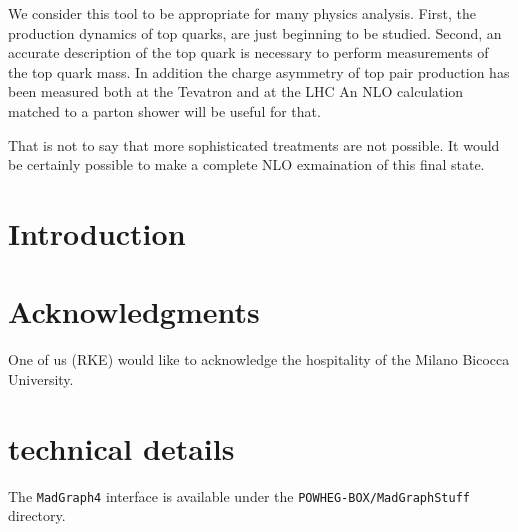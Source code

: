 \documentclass[paper]{JHEP3}
\newcommand\MG{{\tt MadGraph4}}
\newcommand\MGS{{\tt MadGraphStuff}}
\begin{document}
We consider this tool to be appropriate for many physics analysis.
First, the production dynamics of top quarks, are just beginning to be studied.
Second, an accurate description of the top quark is necessary to perform 
measurements of the top quark mass. In addition the charge asymmetry
of top pair production has been measured both at the Tevatron and at the LHC
An NLO calculation matched to a parton shower will be useful for that. 

That is not to say that more sophisticated treatments are not possible.
It would be certainly possible to make a complete NLO exmaination of this final state.
\renewcommand\arraystretch{1.1}

\maketitle

\section{Introduction}





\section*{Acknowledgments}
One of us (RKE) would like to acknowledge the hospitality of the Milano Bicocca
University.

\appendix
\section{technical details}
\label{app:tech_details}
The \MG{} interface is available under the {\tt POWHEG-BOX/\MGS} directory.


\end{document}
